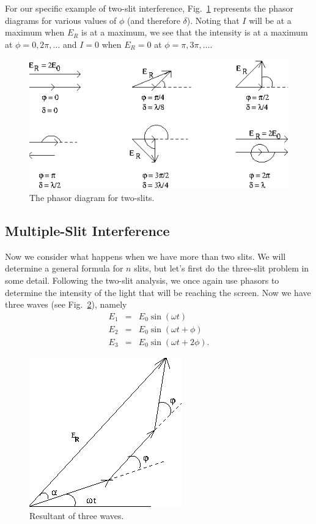 For our specific example of two-slit interference,
Fig.~\ref{fig:diff:phasors_2slit} represents the phasor 
diagrams for various values of $\phi$ (and therefore $\delta$).  
Noting that $I$ will be at a maximum when $E_R$ is at a maximum,
we see that the intensity is at a maximum at $\phi = 0,2\pi,\dots$ and 
$I = 0$ when $E_R=0$ at $\phi = \pi,3\pi,\dots $.
\pagebreak  
\begin{figure}[htb]
\centering 
\epsfxsize=12cm \includegraphics[scale=2.0]{10_diffraction/phasors_2slit.eps}
\caption{The phasor diagram for two-slits.}
\label{fig:diff:phasors_2slit}
\end{figure}
 
\subsection{Multiple-Slit Interference}
Now we consider what happens when we have more than two slits.
We will determine a general formula for $n$ slits, but let's first
do the three-slit problem in some detail.  Following the two-slit
analysis, we once again use phasors to determine the intensity
of the light that will be reaching the screen. 
Now we have three waves (see Fig.~\ref{fig:diff:3E}), namely
\begin{eqnarray}
E_1 & = & E_0 \sin( \omega t) \\
E_2 & = & E_0 \sin( \omega t+ \phi) \\
E_3 & = & E_0 \sin( \omega t + 2 \phi). 
\end{eqnarray}
\pagebreak
\begin{figure}[htb]
\centering 
\epsfxsize=4cm \includegraphics[scale=1.4]{10_diffraction/3E.eps}
\caption{Resultant of three waves.}
\label{fig:diff:3E}
\end{figure}

